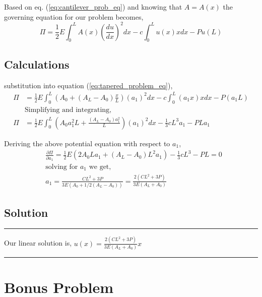 \documentclass[a4paper]{memoir}
\begin{document}
Based on eq. (\ref{eq:cantilever_prob_eq}) and knowing that $A = A(x)$ the governing equation for our problem becomes,
\begin{equation}
	\Pi = \frac{1}{2} E \int^L_0 A(x) \left( \frac{du}{dx} \right)^2dx - c\int^L_0 u(x)xdx - Pu(L)
	\label{eq:tapered_problem_eq}
\end{equation}

\subsection{Calculations}

substitution into equation (\ref{eq:tapered_problem_eq}),
\begin{align*}
	\Pi &= \frac{1}{2} E \int^L_0 (A_0+(A_L-A_0)\frac{x}{L})(a_1)^2 dx - c\int^L_0 (a_1x)xdx - P(a_1L) \\	
	& \text{Simplifying and integrating,} \\
	\Pi &= \frac{1}{2} E \int^L_0 (A_0a_1^2L+\frac{(A_L-A_0)a_1^2}{L})(a_1)^2 dx - \frac{1}{3}cL^3a_1 - PLa_1
\end{align*}

Deriving the above potential equation with respect to $a_1$,
\begin{align*}
	&\frac{\partial \Pi}{\partial a_1} = \frac{1}{2}E (2A_0La_1 + (A_L-A_0)L^2a_1) - \frac{1}{3}cL^3 - PL =0 \\
   & \text{solving for $a_1$ we get,} \\
   & a_1 = \frac{CL^2+3P}{3E(A_0+1/2(A_L-A_0))} = \frac{2(CL^2+3P)}{3E(A_L+A_0)}  
\end{align*}

\subsection{Solution}
\begin{minipage}{300pt}
	\begin{center}{
		\begin{shaded}
			\hrule
			\vspace{20pt}
			Our linear solution is, $u(x) = \frac{2(CL^2+3P)}{3E(A_L+A_0)} x$  %
			\vspace{16pt}
			\hrule
		\end{shaded}
	}
	\end{center}
\end{minipage}

\section{Bonus Problem}
\end{document}

